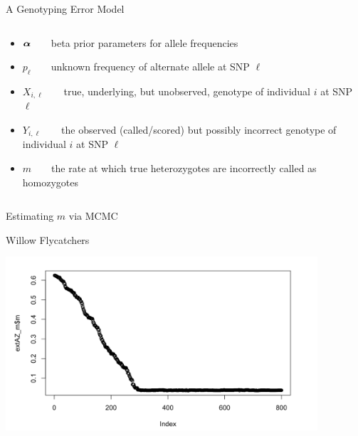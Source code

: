 \documentclass[letter,graphicx]{beamer}
\def\bm#1{\mathpalette\bmstyle{#1}}
\def\bmstyle#1#2{\mbox{\boldmath$#1#2$}}
\begin{document}
\begin{frame}{A Genotyping Error Model}
\begin{columns}
\begin{column}{0.58\textwidth}
        \begin{itemize}
        \item $\bm{\alpha}$~~~~beta prior parameters for allele frequencies
        \item $p_\ell$~~~~unknown frequency of alternate allele at SNP $\ell$
        \item $X_{i,\ell}$~~~~true, underlying, but unobserved, genotype of individual $i$ at SNP $\ell$
        \item $Y_{i,\ell}$~~~~the observed (called/scored) but possibly incorrect genotype of individual $i$ at SNP $\ell$
        \item $m$~~~~the rate at which true heterozygotes are incorrectly called as homozygotes
        \end{itemize}
    \end{column}
\end{columns}
\end{frame}




\begin{frame}{Estimating $m$ via MCMC}
\begin{center}
Willow Flycatchers\\
\vspace*{1em}

\includegraphics[width=0.87\textwidth]{./images/wifl-trace.png}
\end{center}
\end{frame}
\end{document}
